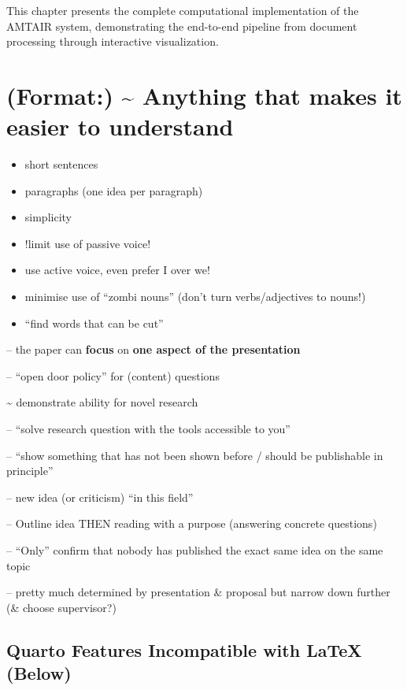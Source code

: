 \documentclass[
  11pt,
  letterpaper,
]{book}
\providecommand{\tightlist}{%
  \setlength{\itemsep}{0pt}\setlength{\parskip}{0pt}}
\begin{document}
This chapter presents the complete computational implementation of the
AMTAIR system, demonstrating the end-to-end pipeline from document
processing through interactive visualization.

\section{(Format:) \textasciitilde{} Anything that makes it easier to
understand}\label{format-anything-that-makes-it-easier-to-understand}

\begin{itemize}
\tightlist
\item
  short sentences\\
\item
  paragraphs (one idea per paragraph)\\
\item
  simplicity\\
\item
  !limit use of passive voice!\\
\item
  use active voice, even prefer I over we!\\
\item
  minimise use of ``zombi nouns'' (don't turn verbs/adjectives to
  nouns!)\\
\item
  ``find words that can be cut''
\end{itemize}

-- the paper can \textbf{focus} on \textbf{one aspect of the
presentation}

-- ``open door policy'' for (content) questions

\textasciitilde{} demonstrate ability for novel research

-- ``solve research question with the tools accessible to you''

-- ``show something that has not been shown before / should be
publishable in principle''

-- new idea (or criticism) ``in this field''

-- Outline idea THEN reading with a purpose (answering concrete
questions)

-- ``Only'' confirm that nobody has published the exact same idea on the
same topic

-- pretty much determined by presentation \& proposal but narrow down
further (\& choose supervisor?)

\subsection*{Quarto Features Incompatible with LaTeX
(Below)}\label{quarto-features-incompatible-with-latex-below}
\end{document}
